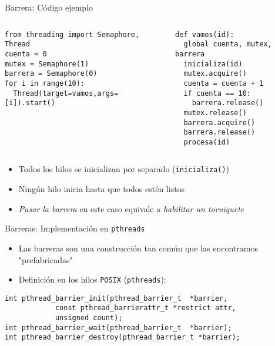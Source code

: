\documentclass[presentation]{beamer}
\begin{document}
\begin{frame}[label={sec:org62a64a1},fragile]{Barrera: Código ejemplo}
 \begin{columns}\begin{column}{0.5\textwidth}
\begin{verbatim}
from threading import Semaphore, Thread
cuenta = 0
mutex = Semaphore(1)
barrera = Semaphore(0)
for i in range(10):
  Thread(target=vamos,args=[i]).start()
\end{verbatim}
\end{column} \begin{column}{0.5\textwidth}
\begin{verbatim}
def vamos(id):
  global cuenta, mutex, barrera
  inicializa(id)
  mutex.acquire()
  cuenta = cuenta + 1
  if cuenta == 10:
    barrera.release()
  mutex.release()
  barrera.acquire()
  barrera.release()
  procesa(id)
\end{verbatim}
\end{column}\end{columns}
\begin{itemize}
\item Todos los hilos se inicializan por separado (\texttt{inicializa()})
\item Ningún hilo inicia hasta que todos estén listos
\item \emph{Pasar la barrera} en este caso equivale a \emph{habilitar un torniquete}
\end{itemize}
\end{frame}

\begin{frame}[label={sec:orgb3c855d},fragile]{Barreras: Implementación en \texttt{pthreads}}
 \begin{itemize}
\item Las barreras son una construcción tan común que las encontramos
"prefabricadas"
\item Definición en los hilos \texttt{POSIX} (\texttt{pthreads}):
\end{itemize}
\begin{verbatim}
int pthread_barrier_init(pthread_barrier_t  *barrier,
		    const pthread_barrierattr_t *restrict attr,
		    unsigned count);
int pthread_barrier_wait(pthread_barrier_t  *barrier);
int pthread_barrier_destroy(pthread_barrier_t *barrier);
\end{verbatim}
\end{frame}
\end{document}
